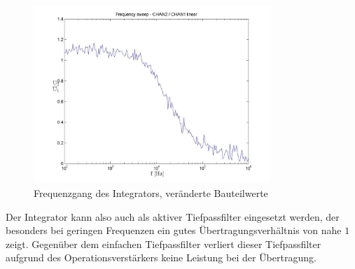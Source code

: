 \documentclass[a4paper]{article}
\begin{document}
\begin{figure}[H]
    \centering
    \includegraphics[width=0.8\textwidth]{versuch4/versuch4_sweep2_frequencysweep_ylinxlog.jpg}
    \caption{Frequenzgang des Integrators, veränderte Bauteilwerte}
    \label{fig:versuch4-sweep2}
\end{figure}

Der Integrator kann also auch als aktiver Tiefpassfilter eingesetzt werden, der besonders bei geringen Frequenzen ein gutes Übertragungsverhältnis von nahe $1$ zeigt.
Gegenüber dem einfachen Tiefpassfilter verliert dieser Tiefpassfilter aufgrund des Operationsverstärkers keine Leistung bei der Übertragung.
\end{document}
